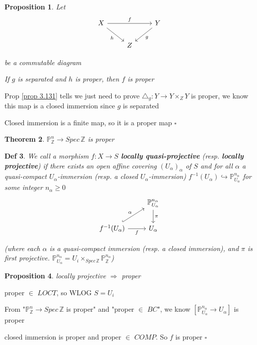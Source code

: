 \documentclass{article}
\newtheorem{theorem}{Theorem}[section]
\newtheorem{definition}[theorem]{Def}
\newtheorem{proposition}[theorem]{Proposition}
\newenvironment{Proof}{{\noindent \indent \it Proof:\quad}}{\hfill $\square$\par}
\begin{document}
\begin{proposition}
    Let
    \[\begin{tikzcd}
	X && Y \\
	& Z
	\arrow["h"', from=1-1, to=2-2]
	\arrow["f", from=1-1, to=1-3]
	\arrow["g", from=1-3, to=2-2]
\end{tikzcd}\]

be a commutable diagram

If $g$ is separated and $h$ is proper, then $f$ is proper
\end{proposition}
\begin{Proof}
    Prop \ref{prop 3.131} tells we just need to prove $\triangle_g:Y\to Y\times_Z Y$ is proper, we know this map is a closed immersion since $g$ is separated

    Closed immersion is a finite map, so it is a proper map
\end{Proof}

\begin{theorem}
    $\mathbb P^n_{\mathbb Z}\to Spec\,\mathbb Z$ is proper
\end{theorem}

\begin{definition}
We call a morphism $f : X \to S$ \textbf{locally quasi-projective} (resp. \textbf{locally
projective}) if there exists an open affine covering $(U_\alpha)_\alpha$ of $S$ and for all $\alpha$ a quasi-compact
$U_\alpha$-immersion (resp. a closed $U_\alpha$-immersion) $f^{-1}(U_\alpha) \hookrightarrow \mathbb P^{n_\alpha}
_{U_\alpha}$ for some integer $n_\alpha \geq 0$
\[\begin{tikzcd}
	& {\mathbb P^{n_\alpha} _{U_\alpha}} \\
	{f^{-1}(U_\alpha)} & {U_\alpha}
	\arrow["f"', from=2-1, to=2-2]
	\arrow["\alpha", hook, from=2-1, to=1-2]
	\arrow["\pi", from=1-2, to=2-2]
\end{tikzcd}\]

(where each $\alpha$ is a quasi-compact
immersion (resp. a closed immersion), and $\pi$ is first projective. $\mathbb P^{n_\alpha} _{U_\alpha}=U_i\times_{Spec\,\mathbb Z}\mathbb P^{n_\alpha} _{\mathbb Z}$)
\end{definition}

\begin{proposition}
    locally projective $\Rightarrow$ proper
\end{proposition}
\begin{Proof}
    proper $\in$ $LOCT$, so WLOG $S=U_i$

    From "$\mathbb P^n_{\mathbb Z}\to Spec\,\mathbb Z$ is proper" and "proper $\in$ $BC$", we know $[\mathbb P_{U_\alpha}^{n_\alpha}\to U_\alpha]$ is proper

    closed immersion is proper and proper $\in$ $COMP$. So $f$ is proper
\end{Proof}
\end{document}
